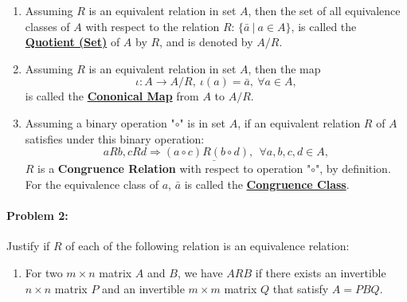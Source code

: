 \documentclass[12pt]{scrartcl}
\begin{document}
{{\begin{enumerate}[label=(\alph*)]
	\item \begin{spacing}{1.2}Assuming $R$ is an equivalent relation in set $A$, then the set of all equivalence classes of $A$ with respect to the relation $R$: $\{\bar{a} ~ | ~ a \in A\}$, is called the \underline{\textbf{Quotient (Set)}} of $A$ by $R$, and is denoted by \underline{$A/R$}. \end{spacing}
	\vspace{0.5em}

	\item \begin{spacing}{1.2}Assuming $R$ is an equivalent relation in set $A$, then the map $$\iota: A \rightarrow A/R, ~\iota(a) = \bar{a}, ~\forall a \in A,$$ is called the \underline{\textbf{Cononical Map}} from $A$ to $A/R$. \end{spacing}
	\vspace{0.5em}

	\item \begin{spacing}{1.2}Assuming a binary operation "$\circ$" is in set $A$, if an equivalent relation $R$ of $A$ satisfies under this binary operation: $$\underline{aRb, cRd \Longrightarrow (a \circ c) R (b \circ d), ~~\forall a,b,c,d \in A},$$ $R$ is a \textbf{Congruence Relation} with respect to operation "$\circ$", by definition. For the equivalence class of $a$, $\bar{a}$ is called the \underline{\textbf{Congruence Class}}.\end{spacing}

	\end{enumerate}

\newpage

\paragraph*{Problem 2: } Justify if $R$ of each of the following relation is an equivalence relation:

	\begin{enumerate}[label=\textbf{\arabic*)}]
	
	\item For two $m \times n$ matrix $A$ and $B$, we have $ARB$ if there exists an invertible $n \times n$ matrix $P$ and an invertible $m \times m$ matrix $Q$ that satisfy $A=PBQ$.
	
\end{enumerate}}}
\end{document}
